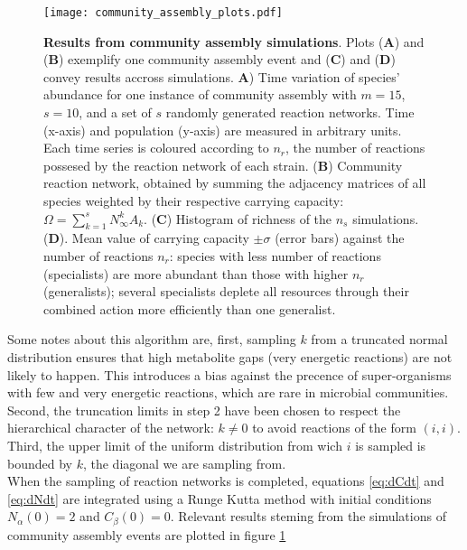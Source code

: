 \documentclass[titlepage,11pt]{article}
\begin{document}
\begin{linenumbers}
			\begin{figure}
				\centering			
				\texttt{[image: community\_assembly\_plots.pdf]}
				\caption{\textbf{Results from community assembly simulations}. Plots (\textbf{A}) and (\textbf{B}) exemplify one community assembly event and  (\textbf{C}) and (\textbf{D}) convey results accross simulations. \textbf{A}) Time variation of species' abundance for one instance of community assembly with $ m = 15 $, $ s = 10 $, and a set of $ s $ randomly generated reaction networks. Time (x-axis) and population (y-axis) are measured in arbitrary units. Each time series is coloured according to $ n_r $, the number of reactions possesed by the reaction network of each strain. (\textbf{B}) Community reaction network, obtained by summing the adjacency matrices of all species weighted by their respective carrying capacity: $ \Omega = \sum_{k = 1}^{s} N^k_{\infty}A_k  $. (\textbf{C}) Histogram of richness of the $ n_s $ simulations. (\textbf{D}). Mean value of carrying capacity $ \pm \sigma$ (error bars) against the number of reactions $ n_r $: species with less number of reactions (specialists) are more abundant than those with higher $ n_r $ (generalists); several specialists deplete all resources through their combined action more efficiently than one generalist.}
				\label{fig:community_assembly_results}
			\end{figure}
			Some notes about this algorithm are, first, sampling $ k $ from a truncated normal distribution ensures that high metabolite gaps (very energetic reactions) are not likely to happen. This introduces a bias against the precence of super-organisms with few and very energetic reactions, which are rare in microbial communities. Second, the truncation limits in step 2 have been chosen to respect the hierarchical character of the network: $ k \neq 0 $ to avoid reactions of the form $ (i, i) $. Third, the upper limit of the uniform distribution from wich $ i $ is sampled is bounded by $ k $, the diagonal we are sampling from. \\
			When the sampling of reaction networks is completed, equations \ref{eq:dCdt} and \ref{eq:dNdt} are integrated using a Runge Kutta method \citep{Dormand1980} with initial conditions $ N_{\alpha}(0) = 2 $ and $ C_{\beta}(0) = 0 $. Relevant results steming from the simulations of community assembly events are plotted in figure \ref{fig:community_assembly_results}
			\newpage

\end{linenumbers}
\end{document}
